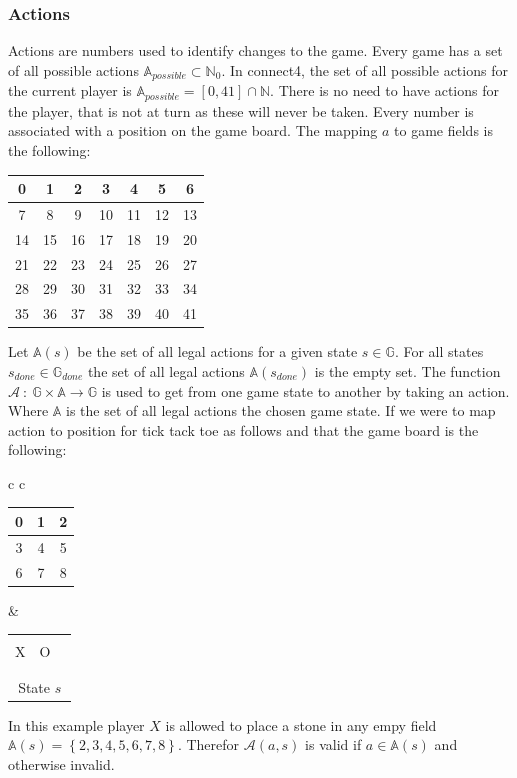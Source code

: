 \documentclass[12pt]{article}
\newcommand{\tickTackToe}[9]{
\begin{tabular}{p{7px}|p{7px}|p{7px}}
\multicolumn{3}{c}{}\\
  #1 & #2 & #3 \\      \hline
  #4 & #5 & #6 \\      \hline
   & #7 & #8\\
\multicolumn{3}{c}{#9}
\end{tabular}
}
\begin{document}
\subsubsection{Actions}
Actions are numbers used to identify changes to the game. Every game has a set of all possible actions \(\mathbb{A}_{possible} \subset \mathbb{N}_0\). In connect4, the set of all possible actions for the current player is \(\mathbb{A}_{possible} = [0, 41]\cap\mathbb N\). There is no need to have actions for the player, that is not at turn as these will never be taken. Every number is associated with a position on the game board. The mapping \(a\) to game fields is the following:
\begin{center}
\begin{tabular}{| c | c | c | c | c | c | c |}
 \hline
0 & 1 & 2 & 3 & 4 & 5 & 6  \\\hline
7 & 8 & 9 & 10 & 11 & 12 & 13\\\hline
14 & 15 & 16 & 17 & 18 & 19 & 20 \\\hline
21 & 22 & 23& 24 & 25 & 26 & 27 \\\hline
28 & 29 & 30 & 31 & 32 & 33 & 34 \\\hline
35 & 36 & 37 & 38 & 39 & 40 & 41 \\\hline
\end{tabular}
\end{center}
Let \(\mathbb{A}(s)\) be the set of all legal actions for a given state  \(s \in \mathbb{G}\). For all states \(s_{done} \in \mathbb{G}_{done}\) the set of all legal actions \(\mathbb{A}(s_{done})\) is the empty set. The function \(\mathcal{A}~:~\mathbb{G}\times\mathbb{A}\to\mathbb{G}\) is used to get from one game state to another by taking an action. Where \(\mathbb A\) is the set of all legal actions the chosen game state. If we were to map action to position for tick tack toe as follows and that the game board is the following:
\begin{center}\begin{tabular} { c c }
\begin{tabular}{| c | c | c |}
 \hline
 0 & 1 & 2 \\\hline
 3 & 4 & 5 \\\hline
 6 & 7 & 8 \\\hline
\end{tabular} & \tickTackToe{X}{O}{}{}{}{}{}{}{State \(s\)}
\end{tabular}\end{center}
In this example player \(X\) is allowed to place a stone in any empy field \(\mathbb A(s) = \left\{ 2, 3, 4, 5, 6, 7, 8 \right\}\). Therefor \(\mathcal A(a, s)\) is valid if \(a \in \mathbb A(s)\) and otherwise invalid.
\end{document}
